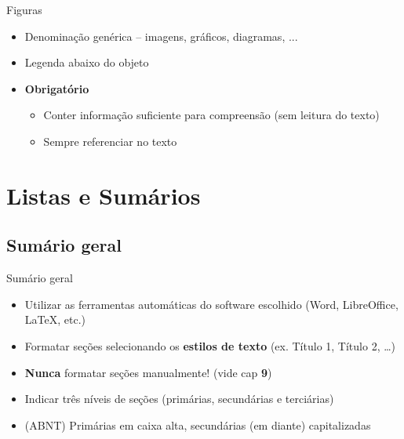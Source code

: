 \documentclass{beamer}
\begin{document}
\begin{frame}{\scriptsize Figuras}
  \begin{itemize}
    \footnotesize
  \item Denominação genérica -- {\scriptsize imagens, gráficos, diagramas,} ...
  \item Legenda abaixo do objeto
    \bigskip
  \item \alert{\bf Obrigatório}
    \begin{itemize}
      \scriptsize
    \item Conter informação suficiente para compreensão ({\tiny sem leitura do texto})
    \item Sempre referenciar no texto
    \end{itemize}
  \end{itemize}
\end{frame}

\section[Sumários]{Listas e Sumários}

\subsection{Sumário geral}

\begin{frame}{\scriptsize Sumário geral}
  \begin{itemize}
    \footnotesize
  \item Utilizar as ferramentas automáticas do software escolhido
    ({\tiny Word, LibreOffice, \LaTeX, etc.})
    \bigskip
  \item Formatar seções selecionando os {\bf estilos de texto}
    ({\tiny ex. Título 1, Título 2, \ldots})
    \bigskip
  \item \alert{\bf Nunca} formatar seções manualmente! ({\tiny vide cap {\bf 9}})
    \bigskip
  \item Indicar três níveis de seções ({\tiny primárias, secundárias e terciárias})
    \bigskip
  \item (ABNT) Primárias em caixa alta, secundárias (em diante)
    capitalizadas
  \end{itemize}
\end{frame}
\end{document}
